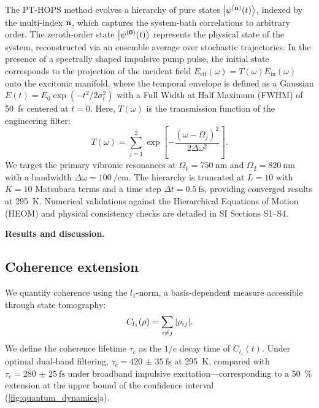 \documentclass[journal=jpcl,manuscript=letter]{achemso}
\begin{document}
The PT-HOPS method evolves a hierarchy of pure states $\ket{\psi^{(\vb{n})}(t)}$, indexed by the multi-index $\vb{n}$, which captures the system-bath correlations to arbitrary order. The zeroth-order state $\ket{\psi^{(\vb{0})}(t)}$ represents the physical state of the system, reconstructed via an ensemble average over stochastic trajectories. In the presence of a spectrally shaped impulsive pump pulse, the initial state corresponds to the projection of the incident field $E_{\mathrm{eff}}(\omega) = T(\omega) E_{\mathrm{in}}(\omega)$ onto the excitonic manifold, where the temporal envelope is defined as a Gaussian $E(t) = E_0 \exp(-t^2/2\sigma_t^2)$ with a Full Width at Half Maximum (FWHM) of \SI{50}{\femto\second} centered at $t = 0$. Here, $T(\omega)$ is the transmission function of the engineering filter:
\begin{equation}
T(\omega) = \sum_{j=1}^2 \exp\left[ -\frac{(\omega - \Omega_{j})^2}{2\Delta\omega^2} \right].
\label{eq:transmission_function}
\end{equation}
We target the primary vibronic resonances at $\Omega_1 = \SI{750}{\nano\meter}$ and $\Omega_2 = \SI{820}{\nano\meter}$ with a bandwidth $\Delta\omega = \SI{100}{\per\centi\meter}$. The hierarchy is truncated at $L=10$ with $K=10$ Matsubara terms and a time step $\Delta t = \SI{0.5}{\femto\second}$, providing converged results at \SI{295}{\kelvin}. Numerical validations against the Hierarchical Equations of Motion (HEOM) and physical consistency checks are detailed in SI Sections S1--S4.


\textbf{Results and discussion.}

\subsection*{Coherence extension}

We quantify coherence using the $l_1$-norm,\cite{Baumgratz2014} a basis-dependent measure accessible through state tomography:
\begin{equation}
C_{l_1}(\rho) = \sum_{i \neq j} \abs{\rho_{ij}}.
\label{eq:l1_coherence}
\end{equation}
We define the coherence lifetime $\tau_c$ as the $1/e$ decay time of $C_{l_1}(t)$. Under optimal dual-band filtering, $\tau_c = \SI{420(35)}{\femto\second}$ at \SI{295}{\kelvin}, compared with $\tau_c = \SI{280(25)}{\femto\second}$ under broadband impulsive excitation---corresponding to a \SI{50}{\percent} extension at the upper bound of the confidence interval (\cref{fig:quantum_dynamics}a).
\end{document}
